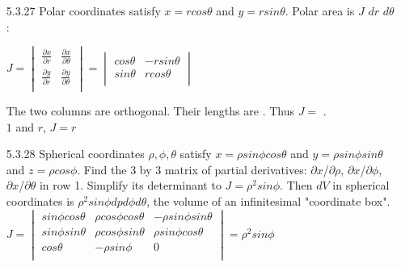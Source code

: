 \documentclass[10pt,twoside,reqno]{article}
\begin{document}
\begin{enumerate}
\vspace{3mm}
\item[5.3.27] Polar coordinates satisfy $x = rcos\theta$ and $y = rsin\theta$. Polar area is $J$ $dr$ $d\theta$:\\
\begin{center}
$
$$
J =
\begin{vmatrix}
\frac{\partial x}{\partial r} & \frac{\partial x}{\partial \theta}\\
\frac{\partial y}{\partial r} & \frac{\partial y}{\partial \theta}\\
\end{vmatrix}
=
\begin{vmatrix}
cos\theta & -rsin\theta\\
sin\theta & rcos\theta\\
\end{vmatrix}
$$
$\\
\end{center}
The two columns are orthogonal. Their lengths are \underline{\hspace{7mm}}. Thus $J =$ \underline{\hspace{7mm}}.\\
\vspace{3mm}
$1$ and $r$, $J = r$\\
\vspace{3mm}
\item[5.3.28] Spherical coordinates $\rho, \phi, \theta$ satisfy $x = \rho sin \phi cos \theta$ and $y = \rho sin \phi sin \theta$ and $z = \rho cos \phi$. Find the 3 by 3 matrix of partial derivatives: $\partial x$/$\partial \rho$, $\partial x$/$\partial \phi$, $\partial x$/$\partial \theta$ in row 1. Simplify its determinant to $J = \rho^2 sin \phi$. Then $dV$ in spherical coordinates is $\rho^2sin\phi dp d\phi d \theta$, the volume of an infinitesimal "coordinate box".\\
\vspace{3mm}
$
$$
J =
\begin{vmatrix}
sin\phi cos\theta & \rho cos \phi cos \theta & -\rho sin \phi sin \theta\\
sin\phi sin\theta & \rho cos \phi sin \theta & \rho sin \phi cos \theta\\
cos\theta & -\rho sin \phi & 0\\
\end{vmatrix}
= \rho ^2 sin\phi
$$
$



\end{enumerate}
\end{document}
